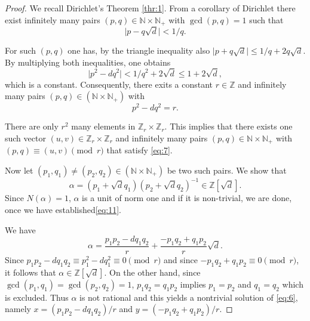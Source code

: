 \documentclass[a4paper,11pt,american]{article}
\newcommand{\N}{\mathbb{N}}
\newcommand{\Z}{\mathbb{Z}}
\theoremstyle{plain}
\theoremstyle{definition}
\begin{document}
\begin{proof}
  We recall Dirichlet's Theorem \eqref{thr:1}. From a corollary of Dirichlet there exist infinitely many pairs $(p,q) \in\N\times\N_+$ with $\gcd(p,q) = 1$ such that 
   \begin{displaymath}
    \vert p - q \sqrt{d}  \vert < 1/q. 
  \end{displaymath}

  For such $(p,q)$ one has, by the triangle inequality also  $ \vert p +  q \sqrt{d}  \vert \leq 1/q + 2 q \sqrt{d} $. By multiplying both inequalities, one obtains
  \begin{displaymath}
    \vert p^2 - d q^2 \vert <  1/q^2 + 2 \sqrt{d} \leq 1 + 2 \sqrt{d},
  \end{displaymath}
  which is a constant. Consequently, there exits a constant $r \in\Z$
  and infinitely many pairs $(p,q) \in(\N\times\N_+)$ with
  \begin{equation}
    \label{eq:7}    
    p^2 - d q^2  = r.
  \end{equation}

  There are only $r^2$ many elements in $\Z_r \times\Z_r$. This implies that
  there exists one such vector $(u,v) \in \Z_r \times\Z_r$ and infinitely many
  pairs $(p,q) \in\N\times\N_+$ with $(p,q) \equiv (u,v) \pmod{r}$ that satisfy
  \eqref{eq:7}.


  Now let   $(p_1,q_1) \neq  (p_2,q_2) \in(\N \times \N_+)$ be two such pairs. We show that
  \begin{equation}
    \label{eq:11}   
  \alpha =  (p_1 + \sqrt{d} q_1 ) (p_2 + \sqrt{d} q_2)^{-1} \in \Z[\sqrt{d}]. 
  \end{equation}
  Since $N(\alpha) = 1$, $\alpha$ is a unit of norm one and if it is non-trivial, we are done, once we have established\eqref{eq:11}.

  We have
  \begin{displaymath}
    \alpha = \frac{p_1 p_2 - d q_1 q_2}{r} + \frac{-p_1q_2 + q_1p_2}{r} \sqrt{d}.  
  \end{displaymath} 
  Since $p_1 p_2 - d q_1 q_2 \equiv p_1^2 - d q_1^2 \equiv 0\pmod{r}$ and since $-p_1q_2 + q_1p_2 \equiv 0 \pmod{r}$, it follows that $\alpha \in\Z[\sqrt{d}]$.  On the other hand, since $\gcd(p_1,q_1) =\gcd(p_2,q_2)=1$,   $p_1q_2 = q_1p_2$ implies $p_1 = p_2$ and $q_1 = q_2$ which is excluded. Thus $\alpha$ is not rational and this yields a nontrivial solution of \eqref{eq:6}, namely $x = (p_1 p_2 - d q_1 q_2)/r$ and $y = (-p_1q_2 + q_1p_2)/{r}$. 
\end{proof}
\end{document}
